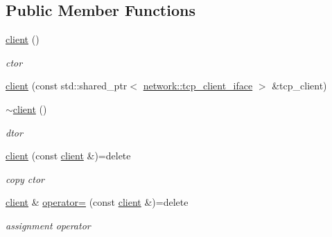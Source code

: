 \subsection*{Public Member Functions}
\begin{DoxyCompactItemize}
\item 
\mbox{\label{classcpp__redis_1_1client_ae03af8753874ada0e32fd281c6828add}} 
\mbox{\hyperlink{classcpp__redis_1_1client_ae03af8753874ada0e32fd281c6828add}{client}} ()
\begin{DoxyCompactList}\small\item\em ctor \end{DoxyCompactList}\item 
\mbox{\hyperlink{classcpp__redis_1_1client_ae879c3a6829a2da9d03f80c1ec4b8d9b}{client}} (const std\+::shared\+\_\+ptr$<$ \mbox{\hyperlink{classcpp__redis_1_1network_1_1tcp__client__iface}{network\+::tcp\+\_\+client\+\_\+iface}} $>$ \&tcp\+\_\+client)
\item 
\mbox{\label{classcpp__redis_1_1client_acf1629e6a3534c87552ab43dd332a581}} 
\mbox{\hyperlink{classcpp__redis_1_1client_acf1629e6a3534c87552ab43dd332a581}{$\sim$client}} ()
\begin{DoxyCompactList}\small\item\em dtor \end{DoxyCompactList}\item 
\mbox{\label{classcpp__redis_1_1client_ab938aeb2a144629fd269594e4af08168}} 
\mbox{\hyperlink{classcpp__redis_1_1client_ab938aeb2a144629fd269594e4af08168}{client}} (const \mbox{\hyperlink{classcpp__redis_1_1client}{client}} \&)=delete
\begin{DoxyCompactList}\small\item\em copy ctor \end{DoxyCompactList}\item 
\mbox{\label{classcpp__redis_1_1client_afdab99b1752e759ab3ce9477f2cb092d}} 
\mbox{\hyperlink{classcpp__redis_1_1client}{client}} \& \mbox{\hyperlink{classcpp__redis_1_1client_afdab99b1752e759ab3ce9477f2cb092d}{operator=}} (const \mbox{\hyperlink{classcpp__redis_1_1client}{client}} \&)=delete
\begin{DoxyCompactList}\small\item\em assignment operator \end{DoxyCompactList}\item 

\end{DoxyCompactItemize}
